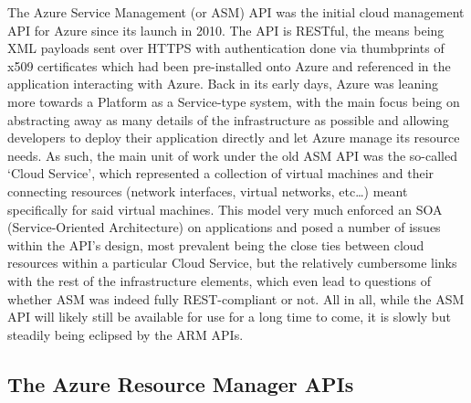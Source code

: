 \documentclass[11pt]{report}
\begin{document}
The Azure Service Management (or ASM) API was the initial cloud management API
for Azure since its launch in 2010. The API is RESTful, the means being XML
payloads sent over HTTPS with authentication done via thumbprints of x509
certificates which had been pre-installed onto Azure and referenced in the
application interacting with Azure.
Back in its early days, Azure was leaning more towards a Platform as a
Service-type system, with the main focus being on abstracting
away as many details of the infrastructure as possible and allowing developers
to deploy their application directly and let Azure manage its resource needs.
\newline
As such, the main unit of work under the old ASM API was the so-called `Cloud
Service', which represented a collection of virtual machines and their
connecting resources (network interfaces, virtual networks, etc\ldots) meant
specifically for said virtual machines. This model very much enforced an SOA
(Service-Oriented Architecture) on applications and posed a number of issues
within the API's design, most prevalent being the close ties between cloud
resources within a particular Cloud Service, but the relatively cumbersome
links with the rest of the infrastructure elements, which even lead to
questions of whether ASM was indeed fully REST-compliant or not. \newline
All in all, while the ASM API will likely still be available for use for a long
time to come, it is slowly but steadily being eclipsed by the ARM APIs.


\subsection{The Azure Resource Manager APIs}
\end{document}
